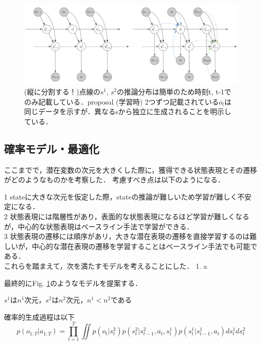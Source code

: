 \begin{figure}[tbp]
  \begin{center}
    \includegraphics[width=\linewidth]{./figures/proposal.png}
    \caption{(縦に分割する！)点線の$s^1$, $s^2$の推論分布は簡単のため時刻t, t-1でのみ記載している．proposal (学習時) 2つずつ記載されている$o_t$は同じデータを示すが．異なるsから独立に生成されることを明示している．}
    \label{fig:proposal}
  \end{center}
\end{figure}


\subsection{確率モデル・最適化}

ここまでで，潜在変数の次元を大きくした際に，獲得できる状態表現とその遷移がどのようなものかを考察した．
考慮すべき点は以下のようになる．

1 stateに大きな次元を仮定した際，stateの推論が難しいため学習が難しく不安定になる． \\
2 状態表現には階層性があり，表面的な状態表現になるほど学習が難しくなるが，中心的な状態表現はベースライン手法で学習ができる． \\
3 状態表現の遷移には順序があリ，大きな潜在表現の遷移を直接学習するのは難しいが，中心的な潜在表現の遷移を学習することはベースライン手法でも可能である． \\

これらを踏まえて，次を満たすモデルを考えることにした．
1. a


最終的にFig. \ref{fig:proposal}のようなモデルを提案する．

$s^1$は$n^1$次元，$s^2$は$n^2$次元，$n^1 < n^2$である

確率的生成過程は以下
\begin{equation}
  p(o_{1:T}|a_{1:T}) = \prod_{t=1}^T \iint p(o_t|s^2_t) p(s^2_t|s^2_{t-1}, a_t, s^1_t) p(s^1_t|s^1_{t-1}, a_t) d{s^1_t}{ds^2_t}
\end{equation}


